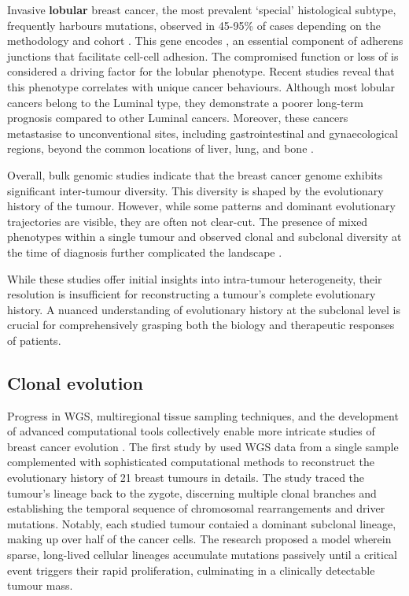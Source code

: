 
Invasive \textbf{lobular} breast cancer, the most prevalent `special' histological subtype, frequently harbours  mutations, observed in 45-95\% of cases depending on the methodology and cohort \parencite{Ciriello2015-ey, McCart_Reed2021-aa}. This gene encodes , an essential component of adherens junctions that facilitate cell-cell adhesion. The compromised function or loss of  is considered a driving factor for the lobular phenotype. Recent studies reveal that this phenotype correlates with unique cancer behaviours. Although most lobular cancers belong to the Luminal type, they demonstrate a poorer long-term prognosis compared to other Luminal cancers. Moreover, these cancers metastasise to unconventional sites, including gastrointestinal and gynaecological regions, beyond the common locations of liver, lung, and bone \parencite{McCart_Reed2021-aa}.

Overall, bulk genomic studies indicate that the breast cancer genome exhibits significant inter-tumour diversity. This diversity is shaped by the evolutionary history of the tumour. However, while some patterns and dominant evolutionary trajectories are visible, they are often not clear-cut. The presence of mixed phenotypes within a single tumour and observed clonal and subclonal diversity at the time of diagnosis further complicated the landscape \parencite{Ciriello2015-ey,Pereira2016-ov,Shah2012-xz}. 

While these studies offer initial insights into intra-tumour heterogeneity, their resolution is insufficient for reconstructing a tumour's complete evolutionary history. A nuanced understanding of evolutionary history at the subclonal level is crucial for comprehensively grasping both the biology and therapeutic responses of patients.

\subsection{Clonal evolution}

Progress in \ac{WGS}, multiregional tissue sampling techniques, and the development of advanced computational tools collectively enable more intricate studies of breast cancer evolution . The first study by \textcite{Nik-Zainal2012-zz} used \ac{WGS} data from a single sample complemented with sophisticated computational methods to reconstruct the evolutionary history of 21 breast tumours in details. The study traced the tumour's lineage back to the zygote, discerning multiple clonal branches and establishing the temporal sequence of chromosomal rearrangements and driver mutations. Notably, each studied tumour contaied a dominant subclonal lineage, making up over half of the cancer cells. The research proposed a model wherein sparse, long-lived cellular lineages accumulate mutations passively until a critical event triggers their rapid proliferation, culminating in a clinically detectable tumour mass. 

